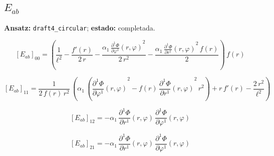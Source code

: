 \documentclass[11pt]{article}
\begin{document}
\subsection*{$ E_{ab} $}
\textbf{Ansatz:} \texttt{draft4\_circular}; \textbf{estado:} completada.\par
\begin{dmath*}[breakdepth={5}]
\left[E_{ab}\right]_{00} = \left(\frac{1}{{\ell}^{2}} - \frac{f'\!\left(r\right)}{2\,r} - \frac{\alpha_{1}\,{\frac{\partial^{1} \Phi}{\partial \varphi^{1}}\!\left(r, \varphi\right)}^{2}}{2\,{r}^{2}} - \frac{\alpha_{1}\,{\frac{\partial^{1} \Phi}{\partial r^{1}}\!\left(r, \varphi\right)}^{2}\,f\!\left(r\right)}{2}\right)\,f\!\left(r\right)
\end{dmath*}
\par\smallskip
\begin{dmath*}[breakdepth={5}]
\left[E_{ab}\right]_{11} = \frac{1}{2\,f\!\left(r\right)\,{r}^{2}}\,\left(\alpha_{1}\,\left({\frac{\partial^{1} \Phi}{\partial \varphi^{1}}\!\left(r, \varphi\right)}^{2} - f\!\left(r\right)\,{\frac{\partial^{1} \Phi}{\partial r^{1}}\!\left(r, \varphi\right)}^{2}\,{r}^{2}\right) + r\,f'\!\left(r\right) - \frac{2\,{r}^{2}}{{\ell}^{2}}\right)
\end{dmath*}
\par\smallskip
\begin{dmath*}[breakdepth={5}]
\left[E_{ab}\right]_{12} = -\alpha_{1}\,\frac{\partial^{1} \Phi}{\partial r^{1}}\!\left(r, \varphi\right)\,\frac{\partial^{1} \Phi}{\partial \varphi^{1}}\!\left(r, \varphi\right)
\end{dmath*}
\par\smallskip
\begin{dmath*}[breakdepth={5}]
\left[E_{ab}\right]_{21} = -\alpha_{1}\,\frac{\partial^{1} \Phi}{\partial r^{1}}\!\left(r, \varphi\right)\,\frac{\partial^{1} \Phi}{\partial \varphi^{1}}\!\left(r, \varphi\right)
\end{dmath*}
\end{document}
